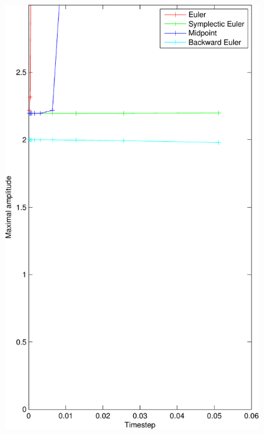\begin{figure}[]
	\begin{center}
		\includegraphics*[width=\textwidth]{graphics/StabilityDamp0-crop.pdf}
	\end{center}
	\caption{}
	\label{fig:}
\end{figure}
